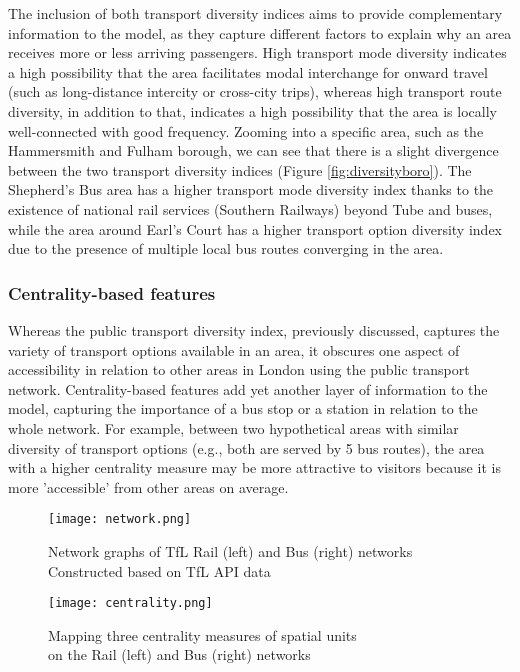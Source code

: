 The inclusion of both transport diversity indices aims to provide complementary information to the model, as they capture different factors to explain why an area receives more or less arriving passengers. High transport mode diversity indicates a high possibility that the area facilitates modal interchange for onward travel (such as long-distance intercity or cross-city trips), whereas high transport route diversity, in addition to that, indicates a high possibility that the area is locally well-connected with good frequency. Zooming into a specific area, such as the Hammersmith and Fulham borough, we can see that there is a slight divergence between the two transport diversity indices (Figure \ref{fig:diversityboro}). The Shepherd's Bus area has a higher transport mode diversity index thanks to the existence of national rail services (Southern Railways) beyond Tube and buses, while the area around Earl's Court has a higher transport option diversity index due to the presence of multiple local bus routes converging in the area.

\pagebreak[4] %
\subsubsection*{Centrality-based features}

Whereas the public transport diversity index, previously discussed, captures the variety of transport options available in an area, it obscures one aspect of accessibility in relation to other areas in London using the public transport network. Centrality-based features add yet another layer of information to the model, capturing the importance of a bus stop or a station in relation to the whole network. For example, between two hypothetical areas with similar diversity of transport options (e.g., both are served by 5 bus routes), the area with a higher centrality measure may be more attractive to visitors because it is more 'accessible' from other areas on average. 

\begin{figure}[hbt]
    \centering
    \texttt{[image: network.png]}
    \captionsetup{justification=centering}
    \caption{Network graphs of TfL Rail (left) and Bus (right) networks\\Constructed based on TfL API data}
    \label{fig:network}
\end{figure}

\begin{figure}[!ht]
    \centering
    \texttt{[image: centrality.png]}
    \captionsetup{justification=centering}
    \caption{Mapping three centrality measures of spatial units\\on the Rail (left) and Bus (right) networks}
    \label{fig:centrality}
\end{figure}

